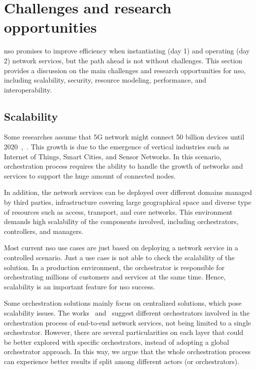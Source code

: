 \section{Challenges and research opportunities}
\label{sec:challenge}

\gls{nso} promises to improve efficiency when instantiating (day 1) and operating (day 2) network services, but the path ahead is not without  challenges. 
This section provides a discussion on the main challenges and research opportunities for \gls{nso}, including scalability, security, resource modeling, performance, and interoperability.

\subsection{Scalability}
 
Some researches assume that 5G network might connect 50 billion devices until 2020~\cite{Panwar2016ACommunication},~\cite{Evans2011TheEverything}. This growth is due to the emergence of vertical industries such as Internet of Things, Smart Cities, and Sensor Networks. In this scenario, orchestration process requires the ability to handle the growth of networks and services to support the huge amount of connected nodes.

In addition, the network services can be deployed over different domains managed by third parties, infrastructure covering large geographical space and diverse type of resources such as access, transport, and core networks. This environment demands high scalability of the components involved, including orchestrators, controllers, and managers. 

Most current \gls{nso} use cases are just based on deploying a network service in a controlled scenario. Just a use case is not able to check the scalability of the solution. In a production environment, the orchestrator is responsible for orchestrating millions of customers and services at the same time. Hence, scalability is an important feature for \gls{nso} success.

Some orchestration solutions mainly focus on centralized solutions, which pose scalability issues. The works~\cite{Alvizu2016AdvanceEra} and~\cite{Garay2016ServiceForward} suggest different orchestrators involved in the orchestration process of end-to-end network services, not being limited to a single orchestrator. However, there are several particularities on each layer that could be better explored with specific orchestrators, instead of adopting a global orchestrator approach. In this way, we argue that the whole orchestration process can experience better results if split among different actors (or orchestrators). 

